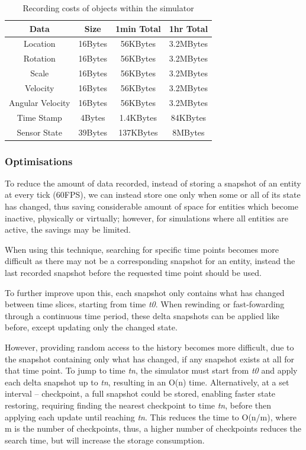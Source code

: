 \begin{table}
	\centering
	\caption{Recording costs of objects within the simulator}
	\begin{tabular}{|c|c|c|c|}
	\hline
	Data & Size & 1min Total & 1hr Total\\\hline
	Location & 16Bytes & 56KBytes & 3.2MBytes\\\hline
	Rotation & 16Bytes & 56KBytes & 3.2MBytes\\\hline
	Scale & 16Bytes & 56KBytes & 3.2MBytes\\\hline
	Velocity & 16Bytes & 56KBytes & 3.2MBytes\\\hline
	Angular Velocity & 16Bytes & 56KBytes & 3.2MBytes\\\hline
	Time Stamp & 4Bytes & 1.4KBytes & 84KBytes\\\hline
	Sensor State & 39Bytes & 137KBytes & 8MBytes\\\hline

	\end{tabular}
	\label{tab:recording_costs}
\end{table}

\subsubsection{Optimisations} %
\label{sub:compressed}
To reduce the amount of data recorded, instead of storing a snapshot of an entity at every tick (60FPS), we can instead store one only when some or all of its state has changed, thus saving considerable amount of space for entities which become inactive, physically or virtually; however, for simulations where all entities are active, the savings may be limited. 

When using this technique, searching for specific time points becomes more difficult as there may not be a corresponding snapshot for an entity, instead the last recorded snapshot before the requested time point should be used.

To further improve upon this, each snapshot only contains what has changed between time slices, starting from time \textit{t0}. When rewinding or fast-fowarding through a continuous time period, these delta snapshots can be applied like before, except updating only the changed state. 

However, providing random access to the history becomes more difficult, due to the snapshot containing only what has changed, if any snapshot exists at all for that time point. To jump to time \textit{tn}, the simulator must start from \textit{t0} and apply each delta snapshot up to \textit{tn}, resulting in an O(n) time. Alternatively, at a set interval -- checkpoint, a full snapshot could be stored, enabling faster state restoring, requiring finding the nearest checkpoint to time \textit{tn}, before then applying each update until reaching \textit{tn}. This reduces the time to O(n/m), where m is the number of checkpoints, thus, a higher number of checkpoints reduces the search time, but will increase the storage consumption.

